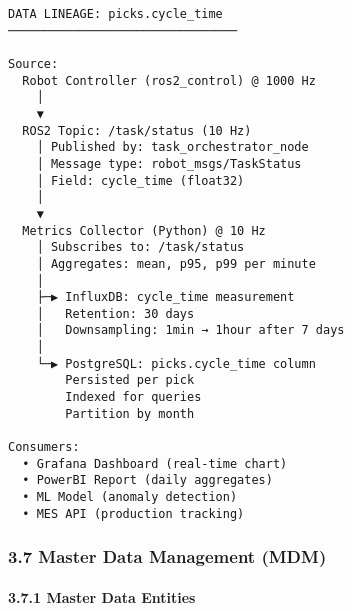 \documentclass[
]{article}
\begin{document}
\begin{verbatim}
DATA LINEAGE: picks.cycle_time
────────────────────────────────

Source:
  Robot Controller (ros2_control) @ 1000 Hz
    │
    ▼
  ROS2 Topic: /task/status (10 Hz)
    │ Published by: task_orchestrator_node
    │ Message type: robot_msgs/TaskStatus
    │ Field: cycle_time (float32)
    │
    ▼
  Metrics Collector (Python) @ 10 Hz
    │ Subscribes to: /task/status
    │ Aggregates: mean, p95, p99 per minute
    │
    ├─▶ InfluxDB: cycle_time measurement
    │   Retention: 30 days
    │   Downsampling: 1min → 1hour after 7 days
    │
    └─▶ PostgreSQL: picks.cycle_time column
        Persisted per pick
        Indexed for queries
        Partition by month

Consumers:
  • Grafana Dashboard (real-time chart)
  • PowerBI Report (daily aggregates)
  • ML Model (anomaly detection)
  • MES API (production tracking)
\end{verbatim}

\hypertarget{master-data-management-mdm}{%
\subsubsection{3.7 Master Data Management
(MDM)}\label{master-data-management-mdm}}

\hypertarget{master-data-entities}{%
\paragraph{3.7.1 Master Data Entities}\label{master-data-entities}}
\end{document}
